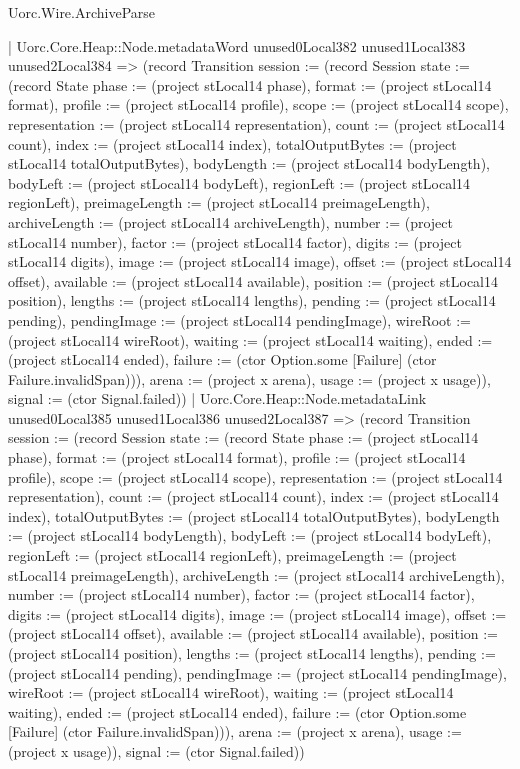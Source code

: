 \begin{lexlean}{Uorc.Wire.ArchiveParse}
\begin{semanticmodule}
{            | Uorc.Core.Heap::Node.metadataWord unused0Local382 unused1Local383 unused2Local384 => (record Transition {session := (record Session {state := (record State {phase := (project stLocal14 phase), format := (project stLocal14 format), profile := (project stLocal14 profile), scope := (project stLocal14 scope), representation := (project stLocal14 representation), count := (project stLocal14 count), index := (project stLocal14 index), totalOutputBytes := (project stLocal14 totalOutputBytes), bodyLength := (project stLocal14 bodyLength), bodyLeft := (project stLocal14 bodyLeft), regionLeft := (project stLocal14 regionLeft), preimageLength := (project stLocal14 preimageLength), archiveLength := (project stLocal14 archiveLength), number := (project stLocal14 number), factor := (project stLocal14 factor), digits := (project stLocal14 digits), image := (project stLocal14 image), offset := (project stLocal14 offset), available := (project stLocal14 available), position := (project stLocal14 position), lengths := (project stLocal14 lengths), pending := (project stLocal14 pending), pendingImage := (project stLocal14 pendingImage), wireRoot := (project stLocal14 wireRoot), waiting := (project stLocal14 waiting), ended := (project stLocal14 ended), failure := (ctor Option.some [Failure] (ctor Failure.invalidSpan))}), arena := (project x arena), usage := (project x usage)}), signal := (ctor Signal.failed)})
            | Uorc.Core.Heap::Node.metadataLink unused0Local385 unused1Local386 unused2Local387 => (record Transition {session := (record Session {state := (record State {phase := (project stLocal14 phase), format := (project stLocal14 format), profile := (project stLocal14 profile), scope := (project stLocal14 scope), representation := (project stLocal14 representation), count := (project stLocal14 count), index := (project stLocal14 index), totalOutputBytes := (project stLocal14 totalOutputBytes), bodyLength := (project stLocal14 bodyLength), bodyLeft := (project stLocal14 bodyLeft), regionLeft := (project stLocal14 regionLeft), preimageLength := (project stLocal14 preimageLength), archiveLength := (project stLocal14 archiveLength), number := (project stLocal14 number), factor := (project stLocal14 factor), digits := (project stLocal14 digits), image := (project stLocal14 image), offset := (project stLocal14 offset), available := (project stLocal14 available), position := (project stLocal14 position), lengths := (project stLocal14 lengths), pending := (project stLocal14 pending), pendingImage := (project stLocal14 pendingImage), wireRoot := (project stLocal14 wireRoot), waiting := (project stLocal14 waiting), ended := (project stLocal14 ended), failure := (ctor Option.some [Failure] (ctor Failure.invalidSpan))}), arena := (project x arena), usage := (project x usage)}), signal := (ctor Signal.failed)})
}
\end{semanticmodule}
\end{lexlean}
